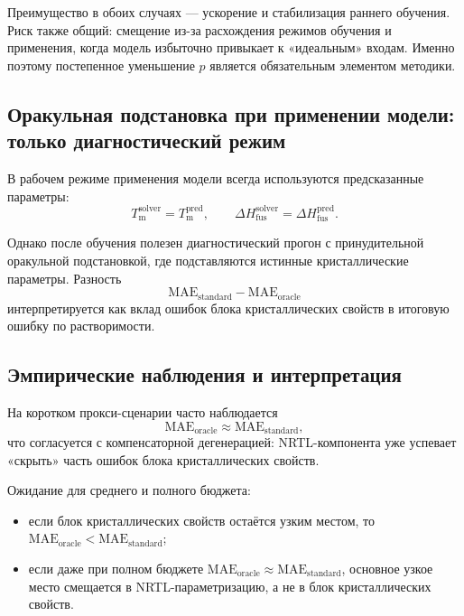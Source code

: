 \documentclass[11pt]{article}
\begin{document}
Преимущество в обоих случаях --- ускорение и стабилизация раннего обучения. Риск также общий: смещение из-за расхождения режимов обучения и применения, когда модель избыточно привыкает к «идеальным» входам. Именно поэтому постепенное уменьшение $p$ является обязательным элементом методики.

\subsection{Оракульная подстановка при применении модели: только диагностический режим}

В рабочем режиме применения модели всегда используются предсказанные параметры:
\begin{equation*}
T_{\mathrm{m}}^{\mathrm{solver}}=T_{\mathrm{m}}^{\mathrm{pred}},\qquad
\Delta H_{\mathrm{fus}}^{\mathrm{solver}}=\Delta H_{\mathrm{fus}}^{\mathrm{pred}}.
\end{equation*}

Однако после обучения полезен диагностический прогон с принудительной оракульной подстановкой, где подставляются истинные кристаллические параметры. Разность
\begin{equation*}
\mathrm{MAE}_{\mathrm{standard}}-\mathrm{MAE}_{\mathrm{oracle}}
\end{equation*}
интерпретируется как вклад ошибок блока кристаллических свойств в итоговую ошибку по растворимости.

\subsection{Эмпирические наблюдения и интерпретация}

На коротком прокси-сценарии часто наблюдается
\begin{equation*}
\mathrm{MAE}_{\mathrm{oracle}}\approx\mathrm{MAE}_{\mathrm{standard}},
\end{equation*}
что согласуется с компенсаторной дегенерацией: NRTL-компонента уже успевает «скрыть» часть ошибок блока кристаллических свойств.

Ожидание для среднего и полного бюджета:
\begin{itemize}
  \item если блок кристаллических свойств остаётся узким местом, то $\mathrm{MAE}_{\mathrm{oracle}}<\mathrm{MAE}_{\mathrm{standard}}$;
  \item если даже при полном бюджете $\mathrm{MAE}_{\mathrm{oracle}}\approx\mathrm{MAE}_{\mathrm{standard}}$, основное узкое место смещается в NRTL-параметризацию, а не в блок кристаллических свойств.
\end{itemize}
\end{document}
